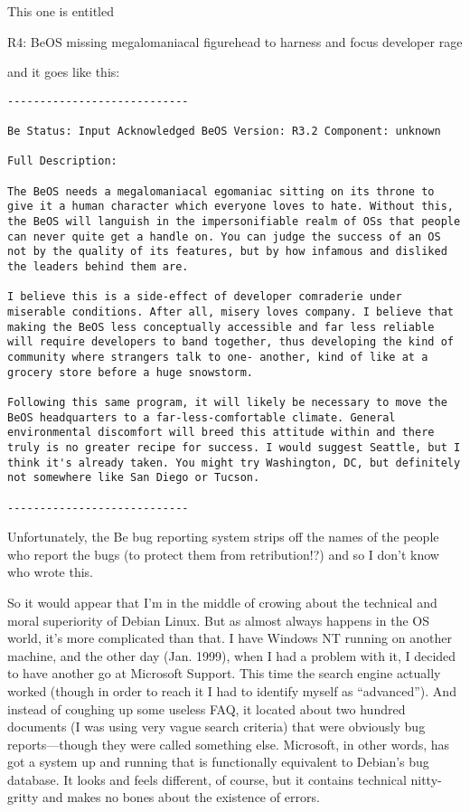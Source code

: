 \documentclass[
  fontsize=11pt,
  paper=landscape,
  twocolumn=true,
  pagesize=pdftex,
  headings=small,
  DIV=15,
  ]{scrartcl}
\begin{document}
This one is entitled

R4: BeOS missing megalomaniacal figurehead to harness and focus
developer rage

and it goes like this:

\begin{lstlisting}
----------------------------

Be Status: Input Acknowledged BeOS Version: R3.2 Component: unknown

Full Description:

The BeOS needs a megalomaniacal egomaniac sitting on its throne to give it a human character which everyone loves to hate. Without this, the BeOS will languish in the impersonifiable realm of OSs that people can never quite get a handle on. You can judge the success of an OS not by the quality of its features, but by how infamous and disliked the leaders behind them are.

I believe this is a side-effect of developer comraderie under miserable conditions. After all, misery loves company. I believe that making the BeOS less conceptually accessible and far less reliable will require developers to band together, thus developing the kind of community where strangers talk to one- another, kind of like at a grocery store before a huge snowstorm.

Following this same program, it will likely be necessary to move the BeOS headquarters to a far-less-comfortable climate. General environmental discomfort will breed this attitude within and there truly is no greater recipe for success. I would suggest Seattle, but I think it's already taken. You might try Washington, DC, but definitely not somewhere like San Diego or Tucson.

----------------------------
\end{lstlisting}
Unfortunately, the Be bug reporting system strips off the names of the
people who report the bugs (to protect them from retribution!?) and so I
don't know who wrote this.

So it would appear that I'm in the middle of crowing about the technical
and moral superiority of Debian Linux. But as almost always happens in
the OS world, it's more complicated than that. I have Windows NT running
on another machine, and the other day (Jan. 1999), when I had a problem
with it, I decided to have another go at Microsoft Support. This time
the search engine actually worked (though in order to reach it I had to
identify myself as ``advanced''). And instead of coughing up some
useless FAQ, it located about two hundred documents (I was using very
vague search criteria) that were obviously bug reports---though they
were called something else. Microsoft, in other words, has got a system
up and running that is functionally equivalent to Debian's bug database.
It looks and feels different, of course, but it contains technical
nitty-gritty and makes no bones about the existence of errors.
\end{document}

